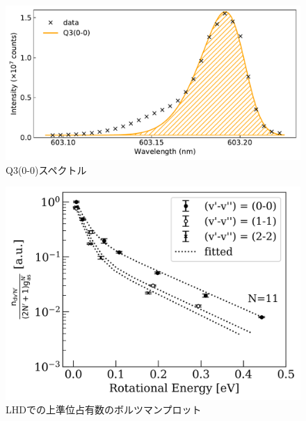 \begin{figure}
    \centering
    \includegraphics[width=15cm]{pictures/skewed-gaussian-fitting-00_Q3.pdf}
    \caption{Q3(0-0)スペクトル}
    \label{fig:voigt-fitting-3}
\end{figure}

\begin{figure}
    \centering
    \includegraphics[width=15cm]{pictures/ishihara-upper-boltzmann.png}
    \caption{LHDでの上準位占有数のボルツマンプロット}
    \label{fig:ishihara-upper-boltzmann}
\end{figure}
